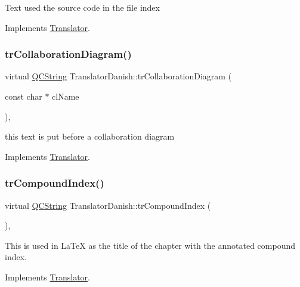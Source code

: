 Text used the source code in the file index 

Implements \mbox{\hyperlink{class_translator}{Translator}}.

\mbox{\label{class_translator_danish_a232950d25ea3b624a0819da0d7d75f9a}} 
\subsubsection{\texorpdfstring{trCollaborationDiagram()}{trCollaborationDiagram()}}
{\footnotesize\ttfamily virtual \mbox{\hyperlink{class_q_c_string}{Q\+C\+String}} Translator\+Danish\+::tr\+Collaboration\+Diagram (\begin{DoxyParamCaption}\item[{const char $\ast$}]{cl\+Name }\end{DoxyParamCaption})\hspace{0.3cm}{\ttfamily [inline]}, {\ttfamily [virtual]}}

this text is put before a collaboration diagram 

Implements \mbox{\hyperlink{class_translator}{Translator}}.

\mbox{\label{class_translator_danish_a4320c4622a15ba230c9c8400d934d941}} 
\subsubsection{\texorpdfstring{trCompoundIndex()}{trCompoundIndex()}}
{\footnotesize\ttfamily virtual \mbox{\hyperlink{class_q_c_string}{Q\+C\+String}} Translator\+Danish\+::tr\+Compound\+Index (\begin{DoxyParamCaption}{ }\end{DoxyParamCaption})\hspace{0.3cm}{\ttfamily [inline]}, {\ttfamily [virtual]}}

This is used in La\+TeX as the title of the chapter with the annotated compound index. 

Implements \mbox{\hyperlink{class_translator}{Translator}}.

\mbox{\label{class_translator_danish_a485989c469752296a1aa78db10db3603}} 
